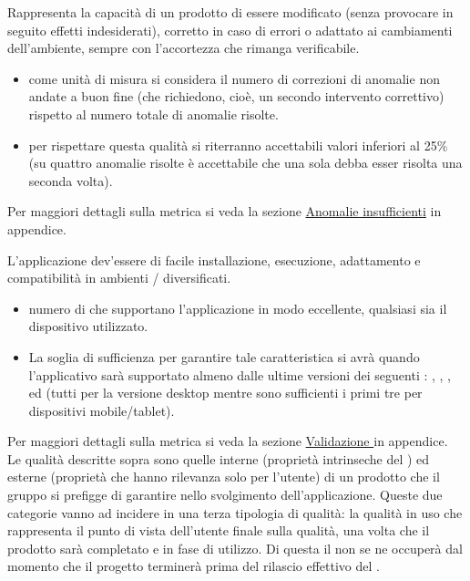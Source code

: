 \documentclass[a4paper, titlepage]{article}
\begin{document}
Rappresenta la capacità di un prodotto  di essere modificato (senza provocare in seguito effetti indesiderati), corretto in caso di errori o adattato ai cambiamenti dell'ambiente, sempre con l'accortezza che rimanga verificabile.
\begin{itemize}
\item {} come unità di misura si considera il numero di correzioni di anomalie non andate a buon fine (che richiedono, cioè, un secondo intervento correttivo) rispetto al numero totale di anomalie risolte.
\item {} per rispettare questa qualità si riterranno accettabili valori inferiori al 25\% (su quattro anomalie risolte è accettabile che una sola debba esser risolta una seconda volta).
\end{itemize}
Per maggiori dettagli sulla metrica si veda la sezione \hyperref[par:anins]{Anomalie insufficienti} in appendice.

L'applicazione dev'essere di facile installazione, esecuzione, adattamento e compatibilità in ambienti / diversificati.
\begin{itemize}
\item {} numero di  che supportano l'applicazione in modo eccellente, qualsiasi sia il dispositivo utilizzato. 
\item {} La soglia di sufficienza per garantire tale caratteristica si avrà quando l'applicativo sarà supportato almeno dalle ultime versioni dei seguenti :  , , ,  ed  (tutti per la versione desktop mentre sono sufficienti i primi tre per dispositivi mobile/tablet).
\end{itemize}
Per maggiori dettagli sulla metrica si veda la sezione \hyperref[par:web]{Validazione } in appendice.
\\ 
\newline Le qualità descritte sopra sono quelle interne (proprietà intrinseche del ) ed esterne (proprietà che hanno rilevanza solo per l’utente) di un prodotto  che il gruppo si prefigge di garantire nello svolgimento dell'applicazione. Queste due categorie vanno ad incidere in una terza tipologia di qualità: la qualità in uso che rappresenta il punto di vista dell'utente finale sulla qualità, una volta che il prodotto sarà completato e in fase di utilizzo. Di questa il  non se ne occuperà dal momento che il progetto terminerà prima del rilascio effettivo del .
\end{document}
